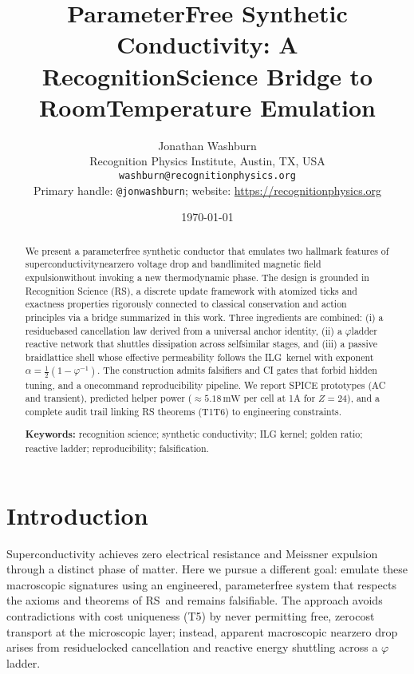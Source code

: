 \documentclass[11pt,a4paper]{article}
\title{Parameter\textendash Free Synthetic Conductivity: A Recognition\textendash Science Bridge to Room\textendash Temperature Emulation}
\author{Jonathan Washburn\\
Recognition Physics Institute, Austin, TX, USA\\
\texttt{washburn@recognitionphysics.org}\\
Primary handle: \texttt{@jonwashburn}; website: \url{https://recognitionphysics.org}}
\date{\today}
\newcommand{\RSabbr}{RS}
\newcommand{\ILG}{\textsc{ILG}}
\begin{document}
\maketitle

\begin{abstract}
We present a parameter\textendash free synthetic conductor that emulates two hallmark features of superconductivity\textemdash near\textendash zero voltage drop and band\textendash limited magnetic field expulsion\textemdash without invoking a new thermodynamic phase. The design is grounded in Recognition Science (\RSabbr), a discrete update framework with atomized ticks and exactness properties rigorously connected to classical conservation and action principles via a bridge summarized in this work. Three ingredients are combined: (i) a residue\textendash based cancellation law derived from a universal anchor identity, (ii) a \(\varphi\)\textendash ladder reactive network that shuttles dissipation across self\textendash similar stages, and (iii) a passive braid\textendash lattice shell whose effective permeability follows the \ILG\ kernel with exponent \(\alpha=\tfrac{1}{2}(1-\varphi^{-1})\). The construction admits falsifiers and CI gates that forbid hidden tuning, and a one\textendash command reproducibility pipeline. We report SPICE prototypes (AC and transient), predicted helper power (\(\approx 5.18\,\mathrm{mW}\) per cell at 1A for \(Z=24\)), and a complete audit trail linking RS theorems (T1\textendash T6) to engineering constraints.\par\noindent
\textbf{Keywords:} recognition science; synthetic conductivity; ILG kernel; golden ratio; reactive ladder; reproducibility; falsification.
\end{abstract}

\section{Introduction}
\label{sec:intro}
Superconductivity achieves zero electrical resistance and Meissner expulsion through a distinct phase of matter. Here we pursue a different goal: emulate these macroscopic signatures using an engineered, parameter\textendash free system that respects the axioms and theorems of \RSabbr\ and remains falsifiable. The approach avoids contradictions with cost uniqueness (T5) by never permitting free, zero\textendash cost transport at the microscopic layer; instead, apparent macroscopic near\textendash zero drop arises from residue\textendash locked cancellation and reactive energy shuttling across a \(\varphi\)\textendash ladder.
\end{document}
